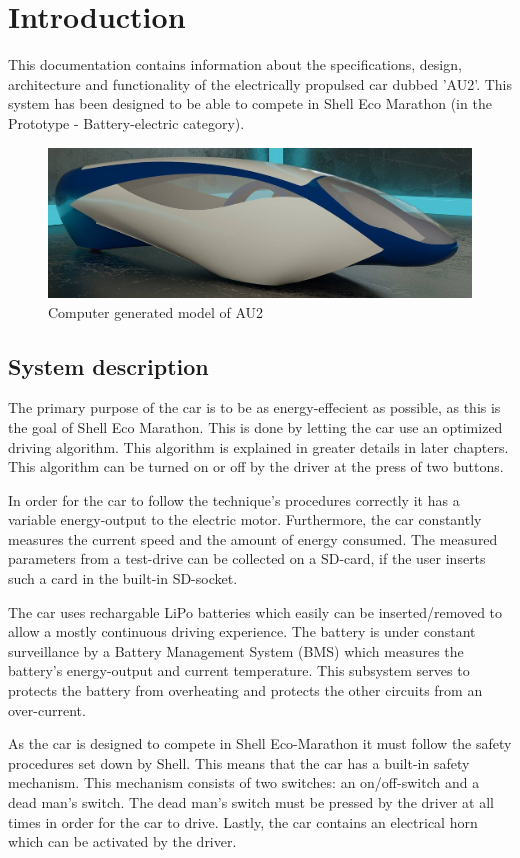 \chapter{Introduction}
This documentation contains information about the specifications, design, architecture and functionality of the electrically propulsed car dubbed 'AU2'. This system has been designed to be able to compete in Shell Eco Marathon (in the Prototype - Battery-electric category).

\begin{figure}[H]
	\centering
	\includegraphics[width=0.6\linewidth]{Introduction/Model}
	\caption{Computer generated model of AU2}
	\label{fig:System_model}
\end{figure}

\section{System description}

The primary purpose of the car is to be as energy-effecient as possible, as this is the goal of Shell Eco Marathon. This is done by letting the car use an optimized driving algorithm. This algorithm is explained in greater details in later chapters. This algorithm can be turned on or off by the driver at the press of two buttons.

In order for the car to follow the technique's procedures correctly it has a variable energy-output to the electric motor. Furthermore, the car constantly measures the current speed and the amount of energy consumed. The measured parameters from a test-drive can be collected on a SD-card, if the user inserts such a card in the built-in SD-socket.

The car uses rechargable LiPo batteries which easily can be inserted/removed to allow a mostly continuous driving experience. The battery is under constant surveillance by a Battery Management System (BMS) which measures the battery's energy-output and current temperature. This subsystem serves to protects the battery from overheating and protects the other circuits from an over-current.

As the car is designed to compete in Shell Eco-Marathon it must follow the safety procedures set down by Shell. This means that the car has a built-in safety mechanism. This mechanism consists of two switches: an on/off-switch and a dead man's switch. The dead man's switch must be pressed by the driver at all times in order for the car to drive. Lastly, the car contains an electrical horn which can be activated by the driver.

